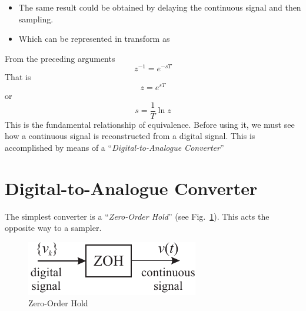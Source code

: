 \begin{slide}\label{slide:l11s2}
\begin{itemize}
  \item The same result could be obtained by delaying the continuous
    signal and then sampling.
  \begin{center}
  \end{center}
  \item Which can be represented in transform as
  \begin{center}
  \end{center}
\end{itemize}
\end{slide}

From the preceding arguments
  \begin{equation}
    \label{eq:l11e1}
    z^{-1} = e^{-sT}
  \end{equation}
  That is 
  \begin{equation}
    \label{eq:l11e2}
    z=e^{sT}
  \end{equation}
or 
\begin{equation}
  \label{eq:l11e3}
  s=\frac{1}{T}\ln z
\end{equation}
This is the fundamental relationship of equivalence. Before using it,
we must see how a continuous signal is reconstructed from a digital
signal. This is accomplished by means of a ``\emph{Digital-to-Analogue
Converter}''

\section*{Digital-to-Analogue
Converter}
The simplest converter is a ``\emph{Zero-Order Hold}'' (see
Fig.~\ref{fig:l11f1}). This acts the opposite way to a sampler.
\begin{figure}[htbp]
  \begin{center}
    \includegraphics{pictures/zoh.pdf}
    \caption{Zero-Order Hold}
    \label{fig:l11f1}
  \end{center}
\end{figure}

